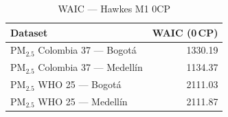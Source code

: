 \begin{table}[htbp]
\centering
\caption{WAIC --- Hawkes M1 0CP}
\label{tab:hawkes_waic_0cp}
\begin{tabular}{lr}
\toprule
Dataset & WAIC (0\,CP) \\
\midrule
PM$_{2.5}$ Colombia 37 --- Bogot\'{a} & 1330.19 \\
PM$_{2.5}$ Colombia 37 --- Medell\'{i}n & 1134.37 \\
PM$_{2.5}$ WHO 25 --- Bogot\'{a} & 2111.03 \\
PM$_{2.5}$ WHO 25 --- Medell\'{i}n & 2111.87 \\
\bottomrule
\end{tabular}
\end{table}
